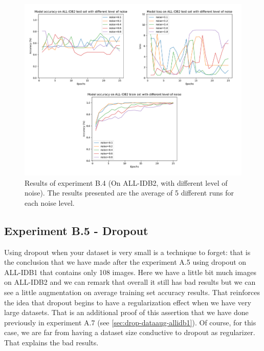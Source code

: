 \documentclass[11pt, openany]{report}
\theoremstyle{plain}
\theoremstyle{definition}
\theoremstyle{remark}
\begin{document}
\begin{figure}[H]
  \centering
  \includegraphics[scale=0.5]{Code/ch6-LeukemiaSubtypes/figures_result/ALL_IDB2/all_idb2-noise.PNG}
  \caption{Results of experiment B.4 (On ALL-IDB2, with different level of noise). The results presented are the average of 5 different runs for each noise level.}
  \label{fig:results-B4}
\end{figure}


\subsection{Experiment B.5 - Dropout}
Using dropout when your dataset is very small is a technique to forget: that is the conclusion that we have made after the experiment A.5 using dropout on ALL-IDB1 that contains only 108 images. Here we have a little bit much images on ALL-IDB2 and we can remark that overall it still has bad results but we can see a little augmentation on average training set accuracy results. That reinforces the idea that dropout begins to have a regularization effect when we have very large datasets. That is an additional proof of this assertion that we have done previously in experiment A.7 (see \autoref{sec:drop-dataaug-allidb1}). Of course, for this case, we are far from having a dataset size conductive to dropout as regularizer. That explains the bad results.  
\end{document}
